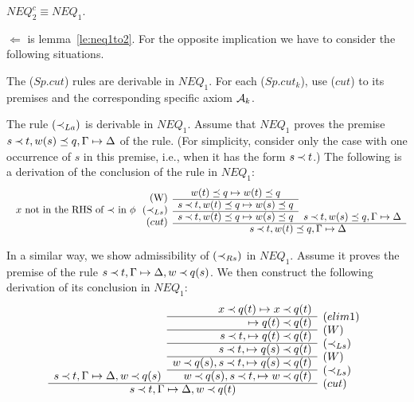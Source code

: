 \begin{CLAIM}\label{le:neq1isneq2}
$NEQ_2^c \equiv NEQ_1$.\end{CLAIM}
\begin{PROOF}
$\Leftarrow$ is lemma~\ref{le:neq1to2}. For the opposite implication we have to 
consider the following situations.
\begin{LS}
\item The ($Sp.cut$) rules  are derivable in $NEQ_1$.
For each ($Sp.cut_k$), use ($cut$) to its premises and the 
corresponding specific axiom ${\cal {A}}_k$.
\item  The rule $(\mathbin{\prec}_{La})$ is derivable in $NEQ_1$.
Assume that $NEQ_1$ proves the premise 
$s\mathbin{\prec} t, w(s)\preceq q,\Gamma\mathrel{\mapsto}\Delta$ %
 of the rule. (For simplicity, 
consider only the case with one occurrence of $s$ in this premise, i.e., when
it has the form $s\mathbin{\prec} t$.)
The following is a derivation of
the conclusion of the rule in $NEQ_1$:
\[ \begin{array}{rcc}
\raisebox{-1.2ex}[1.5ex][0ex]{(W)} & w(t)\preceq q\Seq w(t)\preceq q &  \\ \cline{2-2}
\raisebox{-1.2ex}[1.5ex][0ex]{
$x$ not in the RHS of $\Incl$ in $\phi$\ \ $\iLs$} %
 & s\Incl t,w(t)\preceq q\Seq w(s)\preceq q & 
      \\ \cline{2-2}
 \raisebox{-1.2ex}[1.5ex][0ex]{($cut$)} 
& s\Incl t, w(t)\preceq q\Seq w(s)\preceq q & s\Incl t, w(s)\preceq q,\GSD 
   \\ \cline{2-3}
& \multicolumn{2}{c}{\ \ \ \ \ s\Incl t,w(t)\preceq q,\GSD}
\end{array} \]
\item In a similar way, we show admissibility of $(\mathbin{\prec}_{Rs})$ in $NEQ_1$. Assume it
proves the premise of the rule $s\mathbin{\prec} t, \Gamma\mathrel{\mapsto}\Delta, w\mathbin{\prec} q(s)$. We then construct the 
following derivation of its conclusion in $NEQ_1$:
\[ \begin{array}{rrl}
& x\Incl q(t) \Seq x\Incl q(t) \\ \cline{2-2}
& \Seq q(t)\Incl q(t) & \rabove{(elim1)} \\ \cline{2-2}
& s\Incl t, \Seq q(t)\Incl q(t) & \rabove{(W)} \\ \cline{2-2}
& s\Incl t, \Seq q(s)\Incl q(t) & \rabove{\iLs} \\ \cline{2-2}
& w\Incl q(s), s\Incl t, \Seq q(s)\Incl q(t) & \rabove{(W)} \\ \cline{2-2}
s\Incl t, \GSD, w\Incl q(s) & w\Incl q(s), s\Incl t, \Seq w \Incl q(t) & \rabove{\iLs} \\ \cline{1-2}
\multicolumn{2}{c}{ s\Incl t, \GSD, w\Incl q(t) } & \rabove{(cut)}
\end{array} \]
\end{LS}
\end{PROOF}

